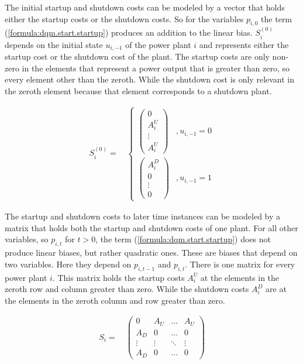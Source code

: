 The initial startup and shutdown costs can be modeled by a vector that holds either the startup costs or the shutdown costs.
So for the variables $p_{i, 0}$ the term (\ref{formula:dqm.start.startup}) produces an addition to the linear bias.
$S_i^{(0)}$ depends on the initial state $u_{i, -1}$ of the power plant $i$ and represents either the startup cost or the shutdown cost of the plant.
The startup costs are only non-zero in the elements that represent a power output that is greater than zero, so every element other than the zeroth.
While the shutdown cost is only relevant in the zeroth element because that element corresponds to a shutdown plant.

\begin{align}
  S_i^{(0)} = \quad \begin{cases}
    \begin{pmatrix}
      0 \\ A_i^U \\ \vdots \\ A_i^U
    \end{pmatrix}
    & , u_{i, -1} = 0 \\
    \begin{pmatrix}
      A_i^D \\ 0 \\ \vdots \\ 0
    \end{pmatrix}
    & , u_{i, -1} = 1
  \end{cases}
\end{align}

The startup and shutdown costs to later time instances can be modeled by a matrix that holds both the startup and shutdown costs of one plant.
For all other variables, so $p_{i, t}$ for $t > 0$, the term (\ref{formula:dqm.start.startup}) does not produce linear biases, but rather quadratic ones.
These are biases that depend on two variables.
Here they depend on $p_{i, t-1}$ and $p_{i, t}$.
There is one matrix for every power plant $i$.
This matrix holds the startup costs $A_i^U$ at the elements in the zeroth row and column greater than zero.
While the shutdown costs $A_i^D$ are at the elements in the zeroth column and row greater than zero.

\begin{align}
  S_i = \quad \begin{pmatrix}
    0   & A_U & \ldots & A_U \\
    A_D &   0 & \ldots &   0 \\
    \vdots & \vdots & \ddots & \vdots \\
    A_D &   0 & \ldots &   0
  \end{pmatrix}
\end{align}


